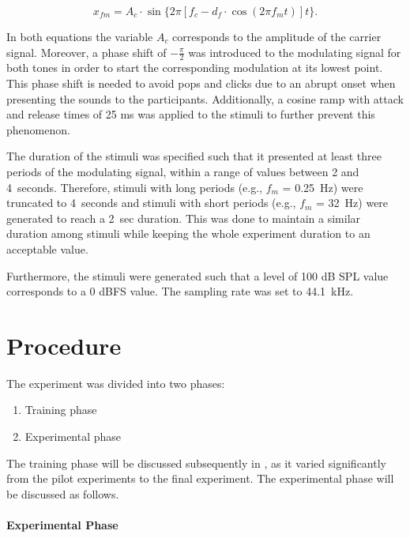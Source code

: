 \documentclass[../main.tex]{subfiles}
\begin{document}
\begin{equation}
  x_{fm} = A_c \cdot \sin \{2 \pi [f_c - d_f \cdot \cos(2 \pi f_m t)] t \}.
  \label{eq:fm}
\end{equation}

In both equations the variable $A_c$ corresponds to the amplitude of the
carrier signal. Moreover, a phase shift of $-\frac{\pi}{2}$ was introduced to
the modulating signal for both tones in order to start the corresponding
modulation at its lowest point. This phase shift is needed to avoid pops and
clicks due to an abrupt onset when presenting the sounds to the participants.
Additionally, a cosine ramp with attack and release times of 25 ms was applied
to the stimuli to further prevent this phenomenon.

The duration of the stimuli was specified such that it presented at least three
periods of the modulating signal, within a range of values between 2 and
4~seconds. Therefore, stimuli with long periods (e.g., $f_m$ = 0.25~Hz) were
truncated to 4~seconds and stimuli with short periods (e.g., $f_m$ = 32~Hz) were
generated to reach a 2~sec duration. This was done to maintain a similar
duration among stimuli while keeping the whole experiment duration to an
acceptable value.

Furthermore, the stimuli were generated such that a level of 100 dB SPL value
corresponds to a 0 dBFS value. The sampling rate was set to 44.1~kHz.

\section{Procedure}
\label{sec:procedure}

The experiment was divided into two phases:
\begin{enumerate}
  \item Training phase
  \item Experimental phase
\end{enumerate}

The training phase will be discussed subsequently in
, as it varied significantly from the pilot
experiments to the final experiment. The experimental phase will be discussed
as follows.

\paragraph{Experimental Phase}

\end{document}
